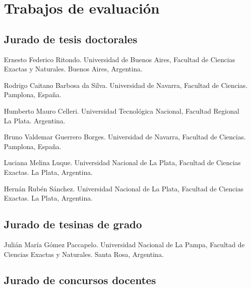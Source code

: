 \section{Trabajos de evaluación}

\subsection{Jurado de tesis doctorales}

\begin{timeline}
 Ernesto Federico Ritondo. Universidad de Buenos Aires, Facultad de Ciencias Exactas y Naturales. Buenos Aires, Argentina.

 Rodrigo Caitano Barbosa da Silva. Universidad de Navarra, Facultad de Ciencias. Pamplona, España.

 Humberto Mauro Celleri. Universidad Tecnológica Nacional, Facultad Regional La Plata. Argentina.

 Bruno Valdemar Guerrero Borges. Universidad de Navarra, Facultad de Ciencias. Pamplona, España.

 Luciana Melina Luque. Universidad Nacional de La Plata, Facultad de Ciencias Exactas. La Plata, Argentina.

 Hernán Rubén Sánchez. Universidad Nacional de La Plata, Facultad de Ciencias Exactas. La Plata, Argentina.
\end{timeline}

\subsection{Jurado de tesinas de grado}

\begin{timeline}
 Julián María Gómez Paccapelo. Universidad Nacional de La Pampa, Facultad de Ciencias Exactas y Naturales. Santa Rosa, Argentina.
\end{timeline}

\subsection{Jurado de concursos docentes}

